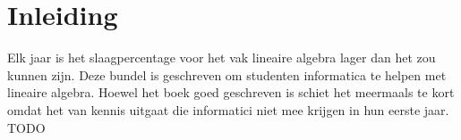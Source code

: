\documentclass[lineaire_algebra_oplossingen.tex]{subfiles}
\begin{document}
\newpage
\section*{Inleiding}
Elk jaar is het slaagpercentage voor het vak lineaire algebra lager dan het zou kunnen zijn. Deze bundel is geschreven om studenten informatica te helpen met lineaire algebra. Hoewel het boek goed geschreven is schiet het meermaals te kort omdat het van kennis uitgaat die informatici niet mee krijgen in hun eerste jaar.
TODO
\end{document}
